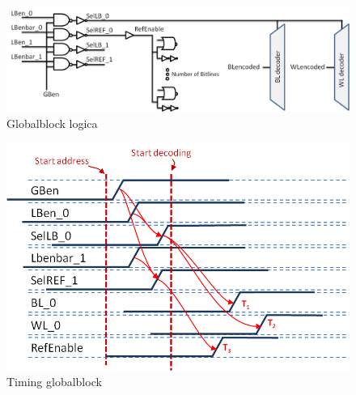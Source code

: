 \begin{figure}[!ht]
  \centering
  \includegraphics[scale=0.6]{../fig/hfdstk-timing-gb1.png}
  \caption{Globalblock logica}
  \label{fig:gb_timing1}
\end{figure}

\begin{figure}[!ht]
  \centering
  \includegraphics[scale=0.9]{../fig/hfdstk-timing-gb2.png}
  \caption{Timing globalblock}
  \label{fig:gb_timing2}
\end{figure}

